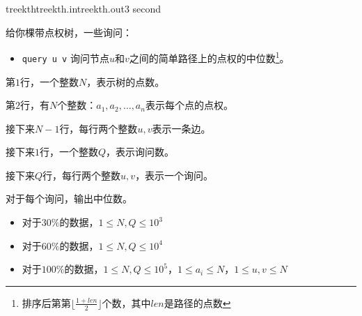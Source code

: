 \documentclass[11pt,a4paper,oneside]{article}
\begin{document}
\begin{problem}{treekth}{treekth.in}{treekth.out}{3 second} 
	
	给你棵带点权树，一些询问：
	
	\begin{itemize}
		\item \texttt{query u v} 询问节点$u$和$v$之间的简单路径上的点权的中位数\footnote{排序后第第$\lfloor \frac{1 + len}{2} \rfloor$个数，其中$len$是路径的点数}。
	\end{itemize}
	
    \InputFile
    
    第$1$行，一个整数$N$，表示树的点数。
    
    第$2$行，有$N$个整数：$a_1,a_2,\dots,a_n$表示每个点的点权。
    
    接下来$N-1$行，每行两个整数$u,v$表示一条边。
    
    接下来$1$行，一个整数$Q$，表示询问数。
    
    接下来$Q$行，每行两个整数$u,v$，表示一个询问。

    \OutputFile

	对于每个询问，输出中位数。

    \Example

    \begin{example}
    \end{example}

    \Note
    
    \begin{itemize}
		\item 对于$30\%$的数据，$1 \leq N, Q \leq 10^3$
		\item 对于$60\%$的数据，$1 \leq N, Q \leq 10^4$
		\item 对于$100\%$的数据，$1 \leq N, Q \leq 10^5$，$1 \leq a_i \leq N$，$1 \leq u, v \leq N$
    \end{itemize}

\end{problem}
\end{document}
